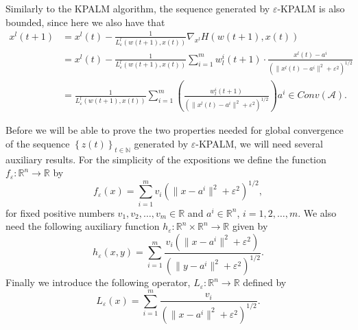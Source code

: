 \documentclass[11pt]{article}
\numberwithin{equation}{section}
\begin{document}
Similarly to the KPALM algorithm, the sequence generated by $\varepsilon$-KPALM is also bounded, since here we also have that
\begin{align*}
	x^l(t+1) &= x^l(t) - \frac{1}{L^l_{\varepsilon}(w(t+1),x(t))} \nabla_{x^l} H(w(t+1),x(t)) \\
	&= x^l(t) - \frac{1}{L^l_{\varepsilon}(w(t+1),x(t))} \sum\limits_{i=1}^{m} w^i_l(t+1) \cdot \frac{x^l(t) - a^i}{\left( \|x^l(t) - a^i\|^2 + {\varepsilon}^2 \right)^{1/2}} \\
	&= \frac{1}{L^l_{\varepsilon}(w(t+1),x(t))} \sum\limits_{i=1}^{m} \left( \frac{w^i_l(t+1)}{\left( \|x^l(t) - a^i\|^2 + {\varepsilon}^2 \right)^{1/2}} \right) a^i \in Conv(\mathcal{A}).
\end{align*}

Before we will be able to prove the two properties needed for global convergence of the sequence $\left\lbrace z(t) \right\rbrace_{t \in \mathbb{N}}$ generated by $\varepsilon$-KPALM, we will need several auxiliary results. For the simplicity of the expositions we define the  function $f_{\varepsilon}: \mathbb{R}^n \rightarrow \mathbb{R}$ by
\begin{equation*}
	f_{\varepsilon}(x) = \sum\limits_{i=1}^{m} v_i \left( \|x - a^i\|^2 + {\varepsilon}^2 \right)^{1/2},
\end{equation*}
for fixed positive numbers $v_1,v_2, \ldots, v_m \in \mathbb{R}$ and $a^i \in \mathbb{R}^n$, $i=1,2, \ldots, m$. We also need the following auxiliary function $h_{\varepsilon}: \mathbb{R}^n \times \mathbb{R}^n \rightarrow \mathbb{R}$ given by
\begin{equation*}
	h_{\varepsilon}(x,y) = \sum\limits_{i=1}^m \frac{v_i \left( \|x-a^i\|^2 + {\varepsilon}^2 \right)}{\left( \|y-a^i\|^2 + {\varepsilon}^2 \right)^{1/2}} .
\end{equation*}
Finally we introduce the following operator, $L_{\varepsilon}: \mathbb{R}^n \rightarrow \mathbb{R}$ defined by
\begin{equation*}
	L_{\varepsilon}(x) = \sum\limits_{i=1}^{m}\frac{v_i}{\left( \|x - a^i\|^2 + {\varepsilon}^2 \right)^{1/2}} .
\end{equation*}
\end{document}
